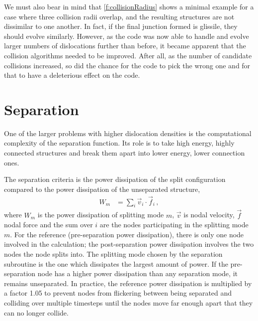 We must also bear in mind that \cref{f:collisionRadius} shows a minimal example for a case where three collision radii overlap, and the resulting structures are not dissimilar to one another. In fact, if the final junction formed is glissile, they should evolve similarly. However, as the code was now able to handle and evolve larger numbers of dislocations further than before, it became apparent that the collision algorithms needed to be improved. After all, as the number of candidate collisions increased, so did the chance for the code to pick the wrong one and for that to have a deleterious effect on the code.

\section{Separation}

One of the larger problems with higher dislocation densities is the computational complexity of the separation function. Its role is to take high energy, highly connected structures and break them apart into lower energy, lower connection ones.

The separation criteria is the power dissipation of the split configuration compared to the power dissipation of the unseparated structure,
\begin{align}\label{eq:powerDiss}
    W_m & = \sum\limits_{i}\vec{v}_i \cdot \vec{f}_i\,,
\end{align}
where $W_m$ is the power dissipation of splitting mode $m$, $\vec{v}$ is nodal velocity, $\vec{f}$ nodal force and the sum over $i$ are the nodes participating in the splitting mode $m$. For the reference (pre-separation power dissipation), there is only one node involved in the calculation; the post-separation power dissipation involves the two nodes the node splits into. The splitting mode chosen by the separation subroutine is the one which dissipates the largest amount of power. If the pre-separation node has a higher power dissipation than any separation mode, it remains unseparated. In practice, the reference power dissipation is multiplied by a factor 1.05 to prevent nodes from flickering between being separated and colliding over multiple timesteps until the nodes move far enough apart that they can no longer collide.

